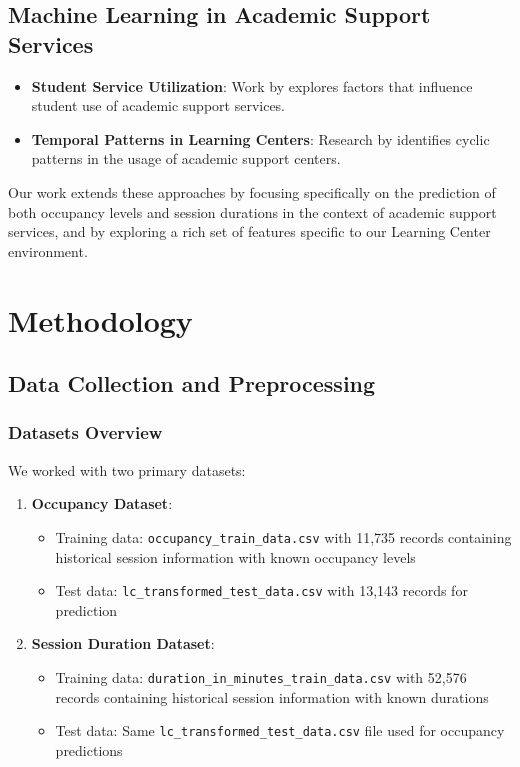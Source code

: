 \documentclass[12pt,letterpaper]{article}
\begin{document}
\subsection{Machine Learning in Academic Support Services}
\begin{itemize}
    \item \textbf{Student Service Utilization}: Work by \citet{martinez2020} explores factors that influence student use of academic support services.
    \item \textbf{Temporal Patterns in Learning Centers}: Research by \citet{wilson2019} identifies cyclic patterns in the usage of academic support centers.
\end{itemize}

Our work extends these approaches by focusing specifically on the prediction of both occupancy levels and session durations in the context of academic support services, and by exploring a rich set of features specific to our Learning Center environment.

\section{Methodology}

\subsection{Data Collection and Preprocessing}

\subsubsection{Datasets Overview}

We worked with two primary datasets:

\begin{enumerate}
    \item \textbf{Occupancy Dataset}: 
    \begin{itemize}
        \item Training data: \texttt{occupancy\_train\_data.csv} with 11,735 records containing historical session information with known occupancy levels
        \item Test data: \texttt{lc\_transformed\_test\_data.csv} with 13,143 records for prediction
    \end{itemize}

    \item \textbf{Session Duration Dataset}:
    \begin{itemize}
        \item Training data: \texttt{duration\_in\_minutes\_train\_data.csv} with 52,576 records containing historical session information with known durations
        \item Test data: Same \texttt{lc\_transformed\_test\_data.csv} file used for occupancy predictions
    \end{itemize}
\end{enumerate}
\end{document}
